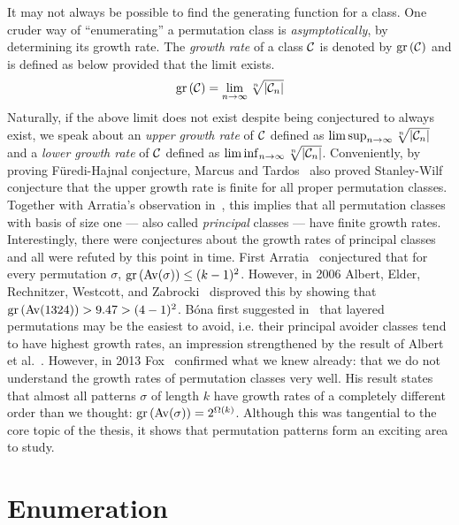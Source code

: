 \documentclass[12pt, a4paper, twoside]{report}
\begin{document}
It may not always be possible to find the generating function for a class. One cruder way of ``enumerating'' a permutation class is \emph{asymptotically}, by determining its growth rate. The \emph{growth rate} of a class $\mathcal{C}$ is denoted by $\mathrm{gr}\left(\mathcal{C}\right)$ and is defined as below provided that the limit exists.
$$\mathrm{gr}\left(\mathcal{C}\right) = \lim_{n\to\infty}\sqrt[n]{|\mathcal{C}_n|}$$
Naturally, if the above limit does not exist despite being conjectured to always exist, we speak about an \emph{upper growth rate} of $\mathcal{C}$ defined as $\lim\sup_{n\to\infty}\sqrt[n]{|\mathcal{C}_n|}$ and a \emph{lower growth rate} of $\mathcal{C}$ defined as $\lim\inf_{n\to\infty}\sqrt[n]{|\mathcal{C}_n|}$. Conveniently, by proving F\"{u}redi-Hajnal conjecture, Marcus and Tardos~\cite{marcus04growthrate} also proved Stanley-Wilf conjecture that the upper growth rate is finite for all proper permutation classes. Together with Arratia's observation in~\cite{arratia1999}, this implies that all permutation classes with basis of size one --- also called \emph{principal} classes --- have finite growth rates. Interestingly, there were conjectures about the growth rates of principal classes and all were refuted by this point in time. First Arratia~\cite{arratia1999} conjectured that for every permutation $\sigma$, $\mathrm{gr}\left(\mathrm{Av}(\sigma)\right) \leq (k-1)^2$. However, in 2006 Albert, Elder, Rechnitzer, Westcott, and Zabrocki~\cite{albert2006wilf} disproved this by showing that $\mathrm{gr}\left(\mathrm{Av}(1324)\right) > 9.47 > (4-1)^2$. B\'ona first suggested in~\cite{bona2005wilf} that layered permutations may be the easiest to avoid, i.e. their principal avoider classes tend to have highest growth rates, an impression strengthened by the result of Albert et al.~\cite{albert2006wilf}. However, in 2013 Fox~\cite{fox2013wilf} confirmed what we knew already: that we do not understand the growth rates of permutation classes very well. His result states that almost all patterns $\sigma$ of length $k$ have growth rates of a completely different order than we thought: $\mathrm{gr}\left(\mathrm{Av}(\sigma)\right) = 2^{\Omega(k)}$. Although this was tangential to the core topic of the thesis, it shows that permutation patterns form an exciting area to study.


\part{Enumeration} %
\label{part:enumeration}
%
\end{document}
